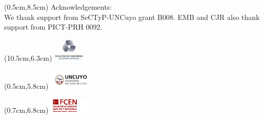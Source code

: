 \documentclass[12pt,t]{beamer}
\begin{document}

\begingroup
\makeatletter
\makeatother
\begin{frame}[plain]
    \maketitle
    \begin{textblock*}{12cm}(0.5cm,8.5cm) %
        \tiny{Acknowledgements:\\ We thank support from SeCTyP-UNCuyo grant B008. EMB and CJR also thank support from PICT-PRH 0092.}
    \end{textblock*}
    \begin{textblock*}{1.5cm}(10.5cm,6.3cm) %
        \includegraphics[width=1.5cm]{Presentacion_PANACM_Franco/fing.png}
    \end{textblock*}
    \begin{textblock*}{2cm}(0.5cm,5.8cm) %
        \includegraphics[width=2cm]{Presentacion_PANACM_Franco/uncuyo.jpg}
    \end{textblock*}
    \begin{textblock*}{2cm}(0.7cm,6.8cm) %
        \includegraphics[width=2cm]{Presentacion_PANACM_Franco/logofcen3.png}
    \end{textblock*}
\end{frame}
\endgroup
\end{document}
